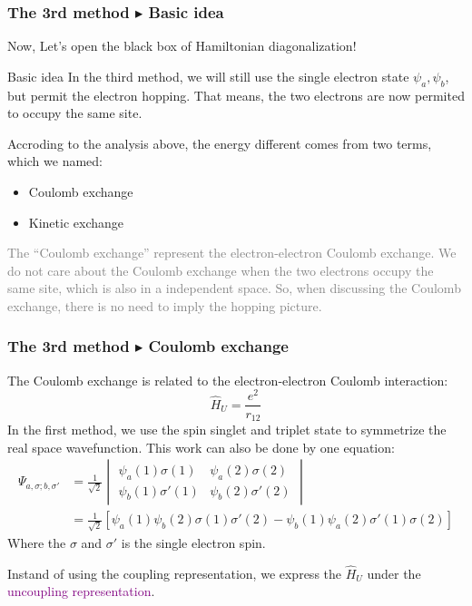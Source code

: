 \documentclass{beamer}
\begin{document}
  \begin{frame}
    \frametitle{The 3rd method \(\blacktriangleright\) Basic idea}
    Now, Let's open the black box of Hamiltonian diagonalization!
    \begin{block}{Basic idea}
      In the third method, we will still use the single electron state \(\psi_a, \psi_b\), but permit the electron hopping. That means, the two electrons are now permited to occupy the same site.
    
      Accroding to the analysis above, the energy different comes from two terms, which we named:
      \begin{itemize}
        \item Coulomb exchange
        \item Kinetic exchange
      \end{itemize}
    \end{block}
    \textcolor{gray}{The ``Coulomb exchange'' represent the electron-electron Coulomb exchange. We do not care about the Coulomb exchange when the two electrons occupy the same site, which is also in a independent space. So, when discussing the Coulomb exchange, there is no need to imply the hopping picture.}
  \end{frame}

  \begin{frame}
    \frametitle{The 3rd method \(\blacktriangleright\) Coulomb exchange}
    The Coulomb exchange is related to the electron-electron Coulomb interaction:
    \begin{equation}
      \widehat{H}_U = \dfrac{e^2}{r_{12}}
    \end{equation}
    In the first method, we use the spin singlet and triplet state to symmetrize the real space wavefunction. This work can also be done by one equation:
    \begin{equation}
      \begin{aligned}
        \Psi_{a,\sigma;b,\sigma'} &= \frac{1}{\sqrt{2}}\begin{vmatrix}
          \psi_a(1)\sigma(1) & \psi_a(2)\sigma(2)\\
          \psi_b(1)\sigma'(1) & \psi_b(2)\sigma'(2)
        \end{vmatrix}\\
        &= \frac{1}{\sqrt{2}}[\psi_a(1)\psi_b(2)\sigma(1)\sigma'(2) - \psi_b(1)\psi_a(2)\sigma'(1)\sigma(2)]
      \end{aligned}
    \end{equation}
    Where the \(\sigma\) and \(\sigma'\) is the single electron spin. 

    Instand of using the coupling representation, we express the \(\widehat{H}_U\) under the \textcolor{purple}{uncoupling representation}. 
  \end{frame}
\end{document}
